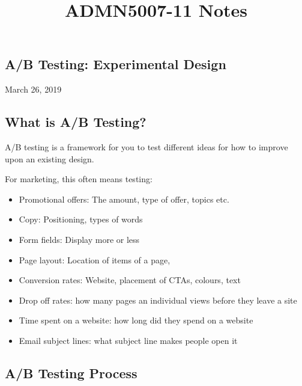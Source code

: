 \documentclass[]{article}
\title{ADMN5007-11 Notes}
\author{}
\date{}
\providecommand{\tightlist}{%
  \setlength{\itemsep}{0pt}\setlength{\parskip}{0pt}}
\begin{document}
\maketitle

\subsection{A/B Testing: Experimental
Design}\label{ab-testing-experimental-design}

March 26, 2019

\subsection{What is A/B Testing?}\label{what-is-ab-testing}

A/B testing is a framework for you to test different ideas for how to
improve upon an existing design.

For marketing, this often means testing:

\begin{itemize}
\tightlist
\item
  Promotional offers: The amount, type of offer, topics etc.
\item
  Copy: Positioning, types of words
\item
  Form fields: Display more or less
\item
  Page layout: Location of items of a page,
\item
  Conversion rates: Website, placement of CTAs, colours, text
\item
  Drop off rates: how many pages an individual views before they leave a
  site
\item
  Time spent on a website: how long did they spend on a website
\item
  Email subject lines: what subject line makes people open it
\end{itemize}

\subsection{A/B Testing Process}\label{ab-testing-process}
\end{document}
